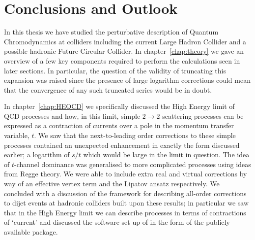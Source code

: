 
\chapter{Conclusions and Outlook}
\label{chap:conclusion}

In this thesis we have studied the perturbative description of Quantum Chromodynamics at colliders
including the current Large Hadron Collider and a possible hadronic Future Circular Collider.  In
chapter~\ref{chap:theory} we gave an overview of a few key components required to perform the
calculations seen in later sections.  In particular, the question of the validity of truncating
this expansion was raised since the presence of large logarithm corrections could mean that the
convergence of any such truncated series would be in doubt.

In chapter~\ref{chap:HEQCD} we specifically discussed the High Energy limit of QCD processes and
how, in this limit, simple $2\to2$ scattering processes can be expressed as a contraction of currents
over a pole in the momentum transfer variable, $t$.  We saw that the next-to-leading order corrections
to these simple processes contained an unexpected enhancement in exactly the form discussed earlier;
a logarithm of $s/t$ which would be large in the limit in question.  The idea of $t$-channel dominance
was generalised to more complicated processes using ideas from Regge theory.  We were able to include
extra real and virtual corrections by way of an effective vertex term and the Lipatov ansatz respectively.
We concluded with a discussion of the \hej framework for describing all-order corrections to dijet events
at hadronic colliders built upon these results; in particular we saw that in the High Energy limit we can describe processes in terms
of contractions of `current' and discussed the software set-up of \hej in the form of the publicly
available \HEJ package.

